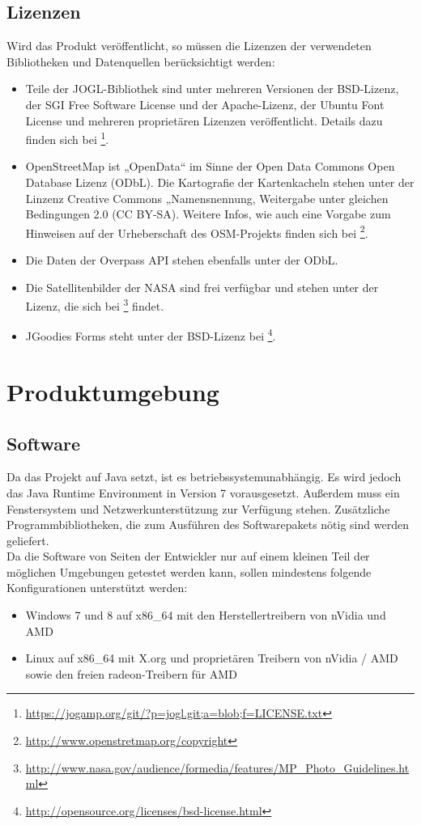 \documentclass[10pt]{scrreprt}
\begin{document}
\section{Lizenzen}
Wird das Produkt veröffentlicht, so müssen die Lizenzen der verwendeten Bibliotheken und Datenquellen berücksichtigt werden:
\begin{itemize}
\item Teile der JOGL-Bibliothek sind unter mehreren Versionen der BSD-Lizenz, der SGI Free Software License und der Apache-Lizenz, der Ubuntu Font License und mehreren proprietären Lizenzen veröffentlicht. Details dazu finden sich bei  \footnote{\url{https://jogamp.org/git/?p=jogl.git;a=blob;f=LICENSE.txt}}.
\item OpenStreetMap ist „OpenData“ im Sinne der Open Data Commons Open Database Lizenz (ODbL). Die Kartografie der Kartenkacheln stehen unter der Linzenz  Creative Commons „Namensnennung, Weitergabe unter gleichen Bedingungen 2.0 (CC BY-SA). Weitere Infos, wie auch eine Vorgabe zum Hinweisen auf der Urheberschaft des OSM-Projekts finden sich bei \footnote{\url{http://www.openstretmap.org/copyright}}.
\item Die Daten der Overpass API stehen ebenfalls unter der ODbL.
\item Die Satellitenbilder der NASA sind frei verfügbar und stehen unter der Lizenz, die sich bei \footnote{\url{http://www.nasa.gov/audience/formedia/features/MP_Photo_Guidelines.html}} findet.
\item JGoodies Forms steht unter der BSD-Lizenz bei \footnote{\url{http://opensource.org/licenses/bsd-license.html}}.
\end{itemize}




\chapter{Produktumgebung}
\section{Software}
Da das Projekt auf Java setzt, ist es betriebssystemunabhängig. Es wird jedoch das Java Runtime Environment in Version 7 vorausgesetzt. Außerdem muss ein Fenstersystem und Netzwerkunterstützung zur Verfügung stehen. Zusätzliche Programmbibliotheken, die zum Ausführen des Softwarepakets nötig sind werden geliefert.\\

Da die Software von Seiten der Entwickler nur auf einem kleinen Teil der möglichen Umgebungen getestet werden kann, sollen mindestens folgende Konfigurationen unterstützt werden:
\begin{itemize}
\item Windows 7 und 8 auf x86{\_}64 mit den Herstellertreibern von nVidia und AMD
\item Linux auf x86{\_}64 mit X.org und proprietären Treibern von nVidia / AMD sowie den freien radeon-Treibern für AMD
\end{itemize}
\end{document}

